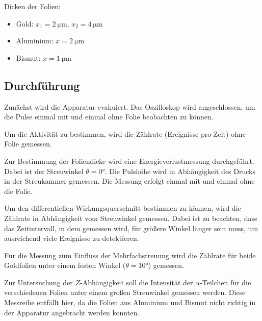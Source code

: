 Dicken der Folien:
\begin{itemize}
  \item Gold: $x_1=\SI{2}{\micro\meter}$, $x_2= \SI{4}{\micro\meter}$
  \item Aluminium: $x=\SI{2}{\micro\meter}$
  \item Bismut: $x=\SI{1}{\micro\meter}$
\end{itemize}


\subsection{Durchführung}
Zunächst wird die Apparatur evakuiert. Das Oszilloskop wird angeschlossen, um die Pulse einmal mit und einmal ohne Folie beobachten zu können.

Um die Aktivität zu bestimmen, wird die Zählrate (Ereignisse pro Zeit) ohne Folie gemessen.

Zur Bestimmung der Foliendicke wird eine Energieverlustmessung durchgeführt. Dabei ist der Streuwinkel $\theta=0°$. Die Pulshöhe wird in Abhängigkeit des Drucks in der Streukammer gemessen. Die Messung erfolgt einmal mit und einmal ohne die Folie.

Um den differentiellen Wirkungsquerschnitt bestimmen zu können, wird die Zählrate in Abhängigkeit vom Streuwinkel gemessen. Dabei ist zu beachten, dass das Zeitintervall, in dem gemessen wird, für größere Winkel länger sein muss, um ausreichend viele Ereignisse zu detektieren.


Für die Messung zum Einfluss der Mehrfachstreuung wird die Zählrate für beide Goldfolien unter einem festen Winkel ($\theta=10°$) gemessen.

Zur Untersuchung der $Z$-Abhängigkeit soll die Intensität der $\alpha$-Teilchen für die verschiedenen Folien unter einem großen Streuwinkel gemessen werden. Diese Messreihe entfällt hier, da die Folien aus Aluminium und Bismut nicht richtig in der Apparatur angebracht werden konnten.
